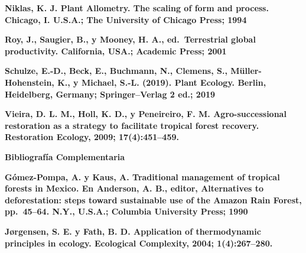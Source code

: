 \documentclass[
]{article}
\begin{document}
\textbf{Niklas, K. J. Plant Allometry. The scaling of form and process.
Chicago, I. U.S.A.; The University of Chicago Press; 1994}

\textbf{Roy, J., Saugier, B., y Mooney, H. A., ed.~Terrestrial global
productivity. California, USA.; Academic Press; 2001}

\textbf{Schulze, E.-D., Beck, E., Buchmann, N., Clemens, S.,
Müller-Hohenstein, K., y Michael, S.-L. (2019). Plant Ecology. Berlin,
Heidelberg, Germany; Springer--Verlag 2 ed.; 2019}

\textbf{Vieira, D. L. M., Holl, K. D., y Peneireiro, F. M.
Agro-successional restoration as a strategy to facilitate tropical
forest recovery. Restoration Ecology, 2009; 17(4):451--459.}

\textbf{\hfill\break
}

\textbf{Bibliografía Complementaria}

\textbf{Gómez-Pompa, A. y Kaus, A. Traditional management of tropical
forests in Mexico. En Anderson, A. B., editor, Alternatives to
deforestation: steps toward sustainable use of the Amazon Rain Forest,
pp.~45--64. N.Y., U.S.A.; Columbia University Press; 1990}

\textbf{Jørgensen, S. E. y Fath, B. D. Application of thermodynamic
principles in ecology. Ecological Complexity, 2004; 1(4):267--280.}
\end{document}
